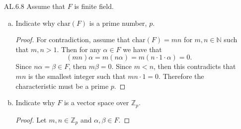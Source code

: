 \documentclass[12pt]{article}
\begin{document}
\begin{enumerate}
\begin{enumerate}[(a)]
\begin{proof}
\begin{align*}
                            J=(x^2+7)_i & &J=(x^3+7x)_i \\
                            J=(x^4+7x)_i.
                        \end{align*}
                    \end{proof}
                \item Determine, with explanation, all ideals $J$ from (b) such
                    that $\mathbb{Q}[x]/J$ is a field, and express each of
                    these fields in the form $\mathbb{Q}(d)$ for some
                    $d\in\mathbb{C}$. 
                    \begin{proof}
                        In order for $\mathbb{Q}[x]/J$ to be a field, we need
                        for $J$ to be generated by an irreducible polynomial
                        over $\mathbb{Q}$. Of the options from (b), we have
                        $J=(x)_i$ and $J=(x^2+7)_i$. This gives the following
                        fields: $\mathbb{Q}(0)=\mathbb{Q}$ and
                        $\mathbb{Q}(\sqrt{7} )$. 
                    \end{proof}
            \end{enumerate}
        \item[AL.6.8] Assume that $F$ is finite field. 
            \begin{enumerate}[(a)]
                \item Indicate why $\text{char}(F)$ is a prime number, $p$.
                    \begin{proof}
                        For contradiction, assume that $\text{char}(F)=mn$ for
                        $m, n\in\mathbb{N}$ such that $m, n>1$. Then for any
                        $\alpha\in F$ we have that 
                        \begin{equation*}
                            (mn)\alpha=m(n\alpha)=m(n\cdot 1\cdot\alpha)=0.
                        \end{equation*}
                        Since $n\alpha=\beta\in F$, then $m\beta=0$. Since
                        $m<n$, then this contradicts that $mn$ is the smallest
                        integer such that $mn\cdot 1=0$. Therefore the
                        characteristic must be a prime $p$.  
                    \end{proof}
                \item Indicate why $F$ is a vector space over $\mathbb{Z}_p$. 
                    \begin{proof}
                        Let $m, n\in\mathbb{Z}_p$ and $\alpha, \beta\in F$.

\end{proof}
\end{enumerate}
\end{enumerate}
\end{document}
